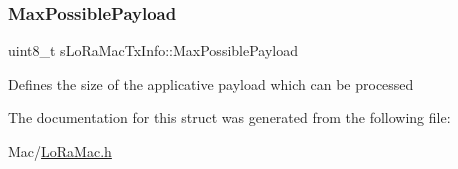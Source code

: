 \subsubsection{\texorpdfstring{Max\+Possible\+Payload}{MaxPossiblePayload}}
{\footnotesize\ttfamily uint8\+\_\+t s\+Lo\+Ra\+Mac\+Tx\+Info\+::\+Max\+Possible\+Payload}

Defines the size of the applicative payload which can be processed 

The documentation for this struct was generated from the following file\+:\begin{DoxyCompactItemize}
\item 
Mac/\hyperlink{LoRaMac_8h}{Lo\+Ra\+Mac.\+h}\end{DoxyCompactItemize}
